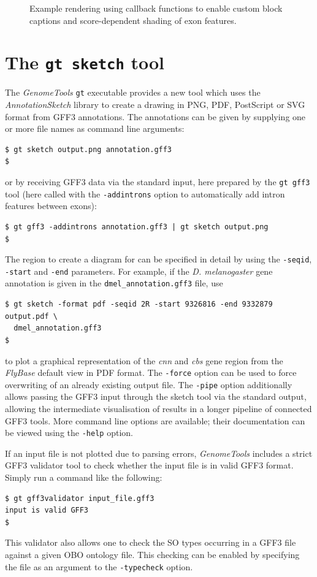 \documentclass[a4paper]{scrreprt}
\begin{document}
\begin{figure}
\caption{Example rendering using callback functions to enable custom block captions and score-dependent shading of exon features.}
\label{callbacks}
\end{figure}

\section{The \texttt{gt sketch} tool}

The \emph{GenomeTools} \texttt{gt} executable provides a new tool which uses the \emph{AnnotationSketch} library to create a drawing in PNG, PDF, PostScript or SVG format from GFF3 annotations. The annotations can be given by supplying one or more file names as command line arguments:
\small
\medskip
\begin{verbatim}
$ gt sketch output.png annotation.gff3
$
\end{verbatim}
\normalsize
\medskip
or by receiving GFF3 data via the standard input, here prepared by the \texttt{gt gff3} tool (here called with the \texttt{-addintrons} option to automatically add intron features between exons):
\small
\medskip
\begin{verbatim}
$ gt gff3 -addintrons annotation.gff3 | gt sketch output.png
$
\end{verbatim}
\normalsize
\medskip
The region to create a diagram for can be specified in detail by using the \texttt{-seqid}, \texttt{-start} and \texttt{-end} parameters. For example, if the \emph{D. melanogaster} gene annotation is given in the \texttt{dmel\_annotation.gff3} file, use
\small
\medskip
\begin{verbatim}
$ gt sketch -format pdf -seqid 2R -start 9326816 -end 9332879 output.pdf \
  dmel_annotation.gff3
$
\end{verbatim}
\normalsize
\medskip
to plot a graphical representation of the \emph{cnn} and \emph{cbs} gene region from the \emph{FlyBase} default view in PDF format.
The \texttt{-force} option can be used to force overwriting of an already existing output file. The \texttt{-pipe} option additionally allows passing the GFF3 input through the sketch tool via the standard output, allowing the intermediate visualisation of results in a longer pipeline of connected GFF3 tools. More command line options are available; their documentation can be viewed using the \texttt{-help} option.

If an input file is not plotted due to parsing errors, \emph{GenomeTools} includes a strict GFF3 validator tool to check whether the input file is in valid GFF3 format. Simply run a command like the following:
\small
\medskip
\begin{verbatim}
$ gt gff3validator input_file.gff3
input is valid GFF3
$
\end{verbatim}
\normalsize
\medskip
This validator also allows one to check the SO types occurring in a GFF3 file against a given OBO ontology file. This checking can be enabled by specifying the file as an argument to the \texttt{-typecheck} option.
\end{document}
